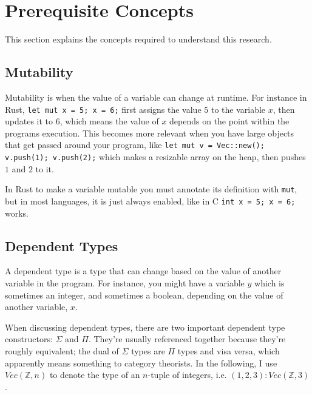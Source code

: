 \documentclass[12pt,twoside]{report}
\begin{document}
\section{Prerequisite Concepts}
\label{prerequisites}
This section explains the concepts required to understand this research.

\subsection{Mutability}
Mutability is when the value of a variable can change at runtime. For instance in Rust, \verb|let mut x = 5; x = 6;| first assigns the value $5$ to the variable $x$, then updates it to $6$, which means the value of $x$ depends on the point within the programs execution. This becomes more relevant when you have large objects that get passed around your program, like \verb|let mut v = Vec::new(); v.push(1); v.push(2);| which makes a resizable array on the heap, then pushes $1$ and $2$ to it.

In Rust to make a variable mutable you must annotate its definition with \verb|mut|, but in most languages, it is just always enabled, like in C \verb|int x = 5; x = 6;| works.

\subsection{Dependent Types}
A dependent type is a type that can change based on the value of another variable in the program. For instance, you might have a variable $y$ which is sometimes an integer, and sometimes a boolean, depending on the value of another variable, $x$.

When discussing dependent types, there are two important dependent type constructors: $\Sigma$ and $\Pi$. They're usually referenced together because they're roughly equivalent; the dual of $\Sigma$ types are $\Pi$ types and visa versa, which apparently means something to category theorists. In the following, I use $Vec(\mathbb{Z}, n)$ to denote the type of an $n$-tuple of integers, i.e. $(1, 2, 3): Vec(\mathbb{Z}, 3)$.
\end{document}
